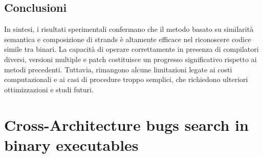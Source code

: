 \documentclass[12pt,a4paper,openright,twoside]{report}
\begin{document}
\subsection{Conclusioni}
In sintesi, i risultati sperimentali confermano che il metodo basato su similarità semantica e composizione di strands è altamente efficace nel riconoscere codice simile tra binari. La capacità di operare correttamente in presenza di compilatori diversi, versioni multiple e patch costituisce un progresso significativo rispetto ai metodi precedenti. Tuttavia, rimangono alcune limitazioni legate ai costi computazionali e ai casi di procedure troppo semplici, che richiedono ulteriori ottimizzazioni e studi futuri.


\section{Cross-Architecture bugs search in binary executables}
\end{document}
